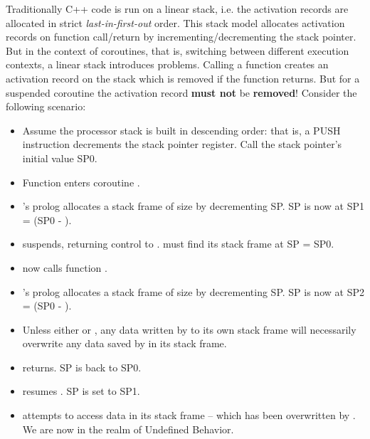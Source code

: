 Traditionally C++ code is run on a linear stack, i.e. the activation
records are allocated in strict \emph{last-in-first-out} order. This stack
model allocates activation records on function call/return by
incrementing/decrementing the stack pointer.\\
But in the context of coroutines, that is, switching between different execution
contexts, a linear stack introduces problems. Calling a function creates an
activation record on the stack which is removed if the function returns.
But for a suspended coroutine the activation record {\bfseries must not} be
{\bfseries removed}!
\newline
Consider the following scenario:
\begin{itemize}
    \item Assume the processor stack is built in descending order: that is, a
          PUSH instruction decrements the stack pointer register. Call the
          stack pointer's initial value SP0.
    \item Function \main enters coroutine .
    \item {}'s prolog allocates a stack frame of
          size  by decrementing SP. SP is now at SP1 =
          (SP0 - ).
    \item {} suspends, returning control to \main. \main must find its
          stack frame at SP = SP0.
    \item \main now calls function .
    \item {}'s prolog allocates a stack frame of
          size  by decrementing SP. SP is now at SP2 =
          (SP0 - ).
    \item Unless either 
          or , any data written by  to
          its own stack frame will necessarily overwrite any data saved
          by  in its stack frame.
    \item {} returns. SP is back to SP0.
    \item \main resumes . SP is set to SP1.
    \item {} attempts to access data in its stack frame -- which has
          been overwritten by . We are now in the realm of Undefined
          Behavior.
\end{itemize}

